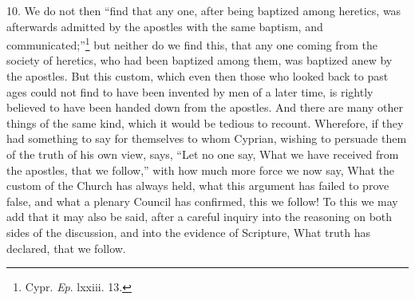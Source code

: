 10. We do not then ``find that any one, after being baptized among heretics, was afterwards admitted by the apostles with the same baptism, and communicated;''\footnote{\par  Cypr. \emph{Ep}. lxxiii. 13.} but neither do we find this, that any one coming from the society of heretics, who had been baptized among them, was baptized anew by the apostles. But this custom, which even then those who looked back to past ages could not find to have been invented by men of a later time, is rightly believed to have been handed down from the apostles. And there are many other things of the same kind, which it would be tedious to recount. Wherefore, if they had something to say for themselves to whom Cyprian, wishing to persuade them of the truth of his own view, says, ``Let no one say, What we have received from the apostles, that we follow,'' with how much more force we now say, What the custom of the Church has always held, what this argument has failed to prove false, and what a plenary Council has confirmed, this we follow! To this we may add that it may also be said, after a careful inquiry into the reasoning on both sides of the discussion, and into the evidence of Scripture, What truth has declared, that we follow.


